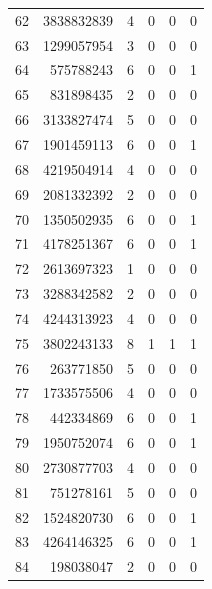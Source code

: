 \begin{longtable}{rrrrrr}
62 & 3838832839 & 4 & 0 & 0 & 0\\

63 & 1299057954 & 3 & 0 & 0 & 0\\

64 & 575788243 & 6 & 0 & 0 & 1\\

65 & 831898435 & 2 & 0 & 0 & 0\\

66 & 3133827474 & 5 & 0 & 0 & 0\\

67 & 1901459113 & 6 & 0 & 0 & 1\\

68 & 4219504914 & 4 & 0 & 0 & 0\\

69 & 2081332392 & 2 & 0 & 0 & 0\\

70 & 1350502935 & 6 & 0 & 0 & 1\\

71 & 4178251367 & 6 & 0 & 0 & 1\\

72 & 2613697323 & 1 & 0 & 0 & 0\\

73 & 3288342582 & 2 & 0 & 0 & 0\\

74 & 4244313923 & 4 & 0 & 0 & 0\\

75 & 3802243133 & 8 & 1 & 1 & 1\\

76 & 263771850 & 5 & 0 & 0 & 0\\

77 & 1733575506 & 4 & 0 & 0 & 0\\

78 & 442334869 & 6 & 0 & 0 & 1\\

79 & 1950752074 & 6 & 0 & 0 & 1\\

80 & 2730877703 & 4 & 0 & 0 & 0\\

81 & 751278161 & 5 & 0 & 0 & 0\\

82 & 1524820730 & 6 & 0 & 0 & 1\\

83 & 4264146325 & 6 & 0 & 0 & 1\\

84 & 198038047 & 2 & 0 & 0 & 0\\


\end{longtable}
